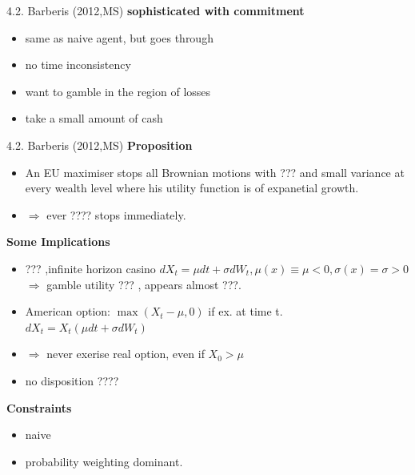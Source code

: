 \documentclass[11pt,aspectratio=169]{beamer}
\begin{document}
\begin{frame}{4.2. Barberis (2012,MS)}
    \textbf{sophisticated with commitment}
    \begin{itemize}
        \item same as naive agent, but goes through \medskip
        \item no time inconsistency \medskip
        \item want to gamble in the region of losses\\
        \item take a small amount of cash
    \end{itemize}
\end{frame}

\begin{frame}{4.2. Barberis (2012,MS)}
    \textbf{Proposition}    
    \begin{itemize}
        \item An EU maximiser stops all Brownian motions with  ??? and small variance at every wealth level where his utility function is of expanetial growth.\\ 
        \item $\Rightarrow$ ever ???? stops immediately.\\
    \end{itemize}
    \textbf{Some Implications}    
    \begin{itemize}
        \item ??? ,infinite horizon casino \medskip
        $dX_t=\mu dt+ \sigma dW_t, \mu(x)\equiv \mu <0, \sigma(x)=\sigma >0 $\\
        $\Rightarrow $ gamble utility ??? , appears almost  ???.\\
        \item American option: $\max (X_t-\mu,0)$ if ex. at time t.\\
        $dX_t=X_t(\mu dt+ \sigma dW_t) $
        \item $\Rightarrow $ never exerise real option, even if $X_0 > \mu$ \medskip
        \item no disposition ????
    \end{itemize}
    \textbf{Constraints}  
    \begin{itemize}
        \item naive \medskip
        \item probability weighting dominant. \medskip
    \end{itemize}
\end{frame}
\end{document}

